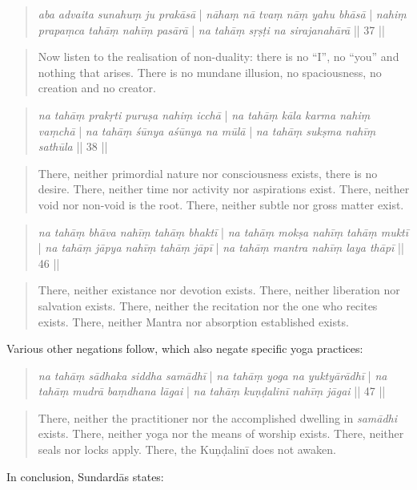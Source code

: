 \begin{quote}
\textit{aba advaita sunahuṃ ju prakāsā} | \textit{nāhaṃ nā tvaṃ nāṃ yahu bhāsā} |
\textit{nahiṃ prapaṃca tahāṃ nahīṃ pasārā} | \textit{na tahāṃ sṛṣṭi na sirajanahārā} || 37 ||
\end{quote}
\begin{quote}
Now listen to the realisation of non-duality: there is no ``I'', no ``you'' and nothing that arises. There is no mundane illusion, no spaciousness, no creation and no creator.
\end{quote}
\begin{quote}
\textit{na tahāṃ prakṛti puruṣa nahiṃ icchā} | \textit{na tahāṃ kāla karma nahiṃ vaṃchā} |
\textit{na tahāṃ śūnya aśūnya na mūlā} | \textit{na tahāṃ sukṣma nahīṃ sathūla} || 38 ||
\end{quote}
\begin{quote}
There, neither primordial nature nor consciousness exists, there is no desire. There, neither time nor activity nor aspirations exist. There, neither void nor non-void is the root. There, neither subtle nor gross matter exist.
\end{quote}
\begin{quote}
\textit{na tahāṃ bhāva nahīṃ tahāṃ bhaktī} | \textit{na tahāṃ mokṣa nahīṃ tahāṃ muktī} |
\textit{na tahāṃ jāpya nahīṃ tahāṃ jāpī} | \textit{na tahāṃ mantra nahīṃ laya thāpī} || 46 || 
\end{quote}
\begin{quote}
There, neither existance nor devotion exists. There, neither liberation nor salvation exists. There, neither the recitation nor the one who recites exists. There, neither Mantra nor absorption established exists.
\end{quote}

Various other negations follow, which also negate specific yoga practices:
\begin{quote}
\textit{na tahāṃ sādhaka siddha samādhī} | \textit{na tahāṃ yoga na yuktyārādhī} | 
\textit{na tahāṃ mudrā baṃdhana lāgai} | \textit{na tahāṃ kuṇḍalinī nahīṃ jāgai} || 47 ||
\end{quote}
\begin{quote}
There, neither the practitioner nor the accomplished dwelling in \textit{samādhi} exists. There, neither yoga nor the means of worship exists. There, neither seals nor locks apply. There, the Kuṇḍalinī does not awaken. 
\end{quote}

In conclusion, Sundardās states:

